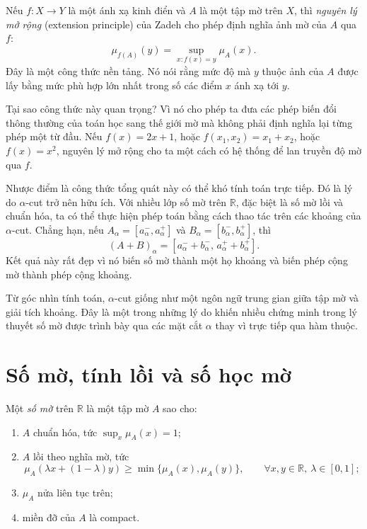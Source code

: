Nếu \(f:X\to Y\) là một ánh xạ kinh điển và \(A\) là một tập mờ trên \(X\), thì \emph{nguyên lý mở rộng} (extension principle) của Zadeh cho phép định nghĩa ảnh mờ của \(A\) qua \(f\):
\[
\mu_{f(A)}(y)=\sup_{x:f(x)=y}\mu_A(x).
\]
Đây là một công thức nền tảng. Nó nói rằng mức độ mà \(y\) thuộc ảnh của \(A\) được lấy bằng mức phù hợp lớn nhất trong số các điểm \(x\) ánh xạ tới \(y\).

Tại sao công thức này quan trọng? Vì nó cho phép ta đưa các phép biến đổi thông thường của toán học sang thế giới mờ mà không phải định nghĩa lại từng phép một từ đầu. Nếu \(f(x)=2x+1\), hoặc \(f(x_1,x_2)=x_1+x_2\), hoặc \(f(x)=x^2\), nguyên lý mở rộng cho ta một cách có hệ thống để lan truyền độ mờ qua \(f\).

Nhược điểm là công thức tổng quát này có thể khó tính toán trực tiếp. Đó là lý do \(\alpha\)-cut trở nên hữu ích. Với nhiều lớp số mờ trên \(\mathbb{R}\), đặc biệt là số mờ lồi và chuẩn hóa, ta có thể thực hiện phép toán bằng cách thao tác trên các khoảng của \(\alpha\)-cut. Chẳng hạn, nếu \(A_\alpha=[a_\alpha^-,a_\alpha^+]\) và \(B_\alpha=[b_\alpha^-,b_\alpha^+]\), thì
\[
(A+B)_\alpha = [a_\alpha^-+b_\alpha^-,\, a_\alpha^+ + b_\alpha^+].
\]
Kết quả này rất đẹp vì nó biến số mờ thành một họ khoảng và biến phép cộng mờ thành phép cộng khoảng.

\begin{remark}
Từ góc nhìn tính toán, \(\alpha\)-cut giống như một ngôn ngữ trung gian giữa tập mờ và giải tích khoảng. Đây là một trong những lý do khiến nhiều chứng minh trong lý thuyết số mờ được trình bày qua các mặt cắt \(\alpha\) thay vì trực tiếp qua hàm thuộc.
\end{remark}

\section{Số mờ, tính lồi và số học mờ}

\begin{definition}
Một \emph{số mờ} trên \(\mathbb{R}\) là một tập mờ \(A\) sao cho:
\begin{enumerate}
\item \(A\) chuẩn hóa, tức \(\sup_x \mu_A(x)=1\);
\item \(A\) lồi theo nghĩa mờ, tức
\[
\mu_A(\lambda x+(1-\lambda)y)\ge \min\{\mu_A(x),\mu_A(y)\},
\qquad \forall x,y\in\mathbb{R},\ \lambda\in[0,1];
\]
\item \(\mu_A\) nửa liên tục trên;
\item miền đỡ của \(A\) là compact.
\end{enumerate}
\end{definition}

